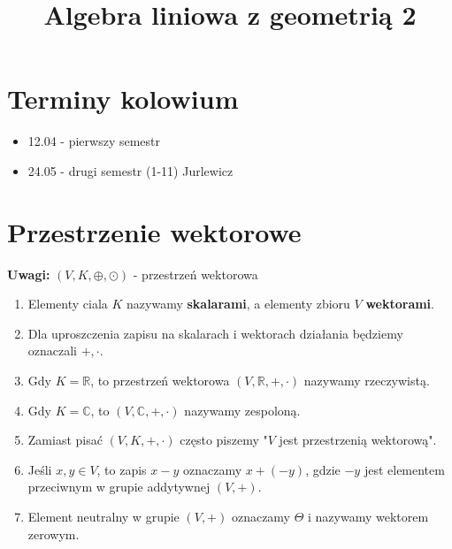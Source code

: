\documentclass[a5paper,8pt]{article}
\title{Algebra liniowa z geometrią 2}
\date{}
\begin{document}
    \maketitle

    \section{Terminy kolowium}

    \begin{itemize}
        \item 12.04 - pierwszy semestr
        \item 24.05 - drugi semestr (1-11) Jurlewicz
    \end{itemize}

    \section{Przestrzenie wektorowe} %
    \label{sec:przestrzenie_wektorowe}

    \large{\textbf{Uwagi:   }}
    $ (V, K, \oplus, \odot) $ - przestrzeń wektorowa

    \begin{enumerate}
        \item Elementy ciala $K$ nazywamy \textbf{skalarami}, a elementy zbioru $V$ \textbf{wektorami}.
        \item Dla uproszczenia zapisu na skalarach i wektorach działania będziemy oznaczali $ +, \cdot $.
        \item Gdy $ K = \mathbb{R} $, to przestrzeń wektorowa $ (V, \mathbb{R}, +, \cdot) $ nazywamy rzeczywistą.
        \item Gdy $ K = \mathbb{C} $, to $ (V, \mathbb{C}, +, \cdot) $ nazywamy zespoloną.
        \item Zamiast pisać $ (V, K, +, \cdot) $ często piszemy "$V$ jest przestrzenią wektorową".
        \item Jeśli $ x, y \in V $, to zapis $x-y$ oznaczamy $x + (-y)$, gdzie $-y$ jest elementem przeciwnym w grupie addytywnej $(V, +)$.
        \item Element neutralny w grupie $(V, +)$ oznaczamy $\Theta$ i nazywamy wektorem zerowym.
    \end{enumerate}
\end{document}
